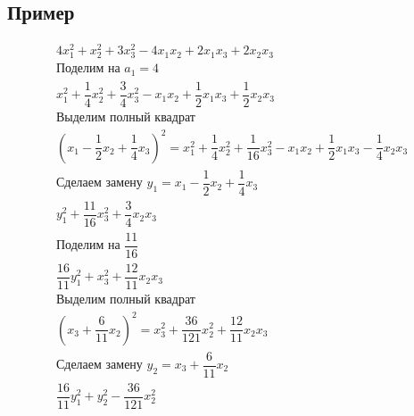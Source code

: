 \documentclass[12pt]{article}
\begin{document}
\subsection{Пример}
\[
    \begin{array}{l}
        4x_1^2 + x_2^2 + 3x_3^2 - 4x_1x_2 + 2x_1x_3 + 2x_2x_3                                                                                           \\
        \text{Поделим на } a_1 = 4                                                                                                                      \\
        x_1^2 + \dfrac{1}{4}x_2^2 + \dfrac{3}{4}x_3^2 - x_1x_2 + \dfrac{1}{2}x_1x_3 + \dfrac{1}{2}x_2x_3                                                \\
        \text{Выделим полный квадрат}                                                                                                                   \\
        (x_1 - \dfrac{1}{2}x_2 + \dfrac{1}{4}x_3)^2 = x_1^2 + \dfrac{1}{4}x_2^2 + \dfrac{1}{16}x_3^2 - x_1x_2 + \dfrac{1}{2}x_1x_3 - \dfrac{1}{4}x_2x_3 \\
        \text{Сделаем замену } y_1 = x_1 - \dfrac{1}{2}x_2 + \dfrac{1}{4}x_3                                                                            \\
        y_1^2 + \dfrac{11}{16}x_3^2 + \dfrac{3}{4}x_2x_3                                                                                                \\
        \text{Поделим на } \dfrac{11}{16}                                                                                                               \\
        \dfrac{16}{11}y_1^2 + x_3^2 + \dfrac{12}{11}x_2x_3                                                                                              \\
        \text{Выделим полный квадрат}                                                                                                                   \\
        (x_3 + \dfrac{6}{11}x_2)^2 = x_3^2 + \dfrac{36}{121}x_2^2 + \dfrac{12}{11}x_2x_3                                                                \\
        \text{Сделаем замену } y_2 = x_3 + \dfrac{6}{11}x_2                                                                                             \\
        \dfrac{16}{11}y_1^2 + y_2^2 - \dfrac{36}{121}x_2^2                                                                                              \\

\end{array}\]
\end{document}
